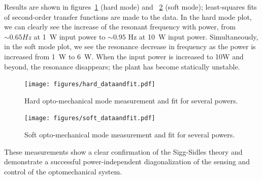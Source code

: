 Results are shown in figures~\ref{fig:hardTF} (hard mode) and
~\ref{fig:softTF} (soft mode); least-squares fits of second-order
transfer functions are made to the data.  In the hard mode plot, we
can clearly see the increase of the resonant frequency with power,
from $\sim0.65 Hz$ at 1~W input power to $\sim0.95$ Hz at 10~W input
power.  Simultaneously, in the soft mode plot, we see the resonance
decrease in frequency as the power is increased from 1~W to 6~W.  When
the input power is increased to 10W and beyond, the resonance
disappears; the plant has become statically unstable.

\begin{figure}
\begin{centering}
\texttt{[image: figures/hard\_dataandfit.pdf]}
\caption{Hard opto-mechanical mode measurement and fit for several
 powers.}
\label{fig:hardTF}
\end{centering}
\end{figure}

\begin{figure}
\begin{centering}
\texttt{[image: figures/soft\_dataandfit.pdf]}
\caption{Soft opto-mechanical mode measurement and fit for several
 powers.}
\label{fig:softTF}
\end{centering}
\end{figure}

These measurements show a clear confirmation of the Sigg-Sidles theory
and demonstrate a successful power-independent diagonalization of the
sensing and control of the optomechanical system.











